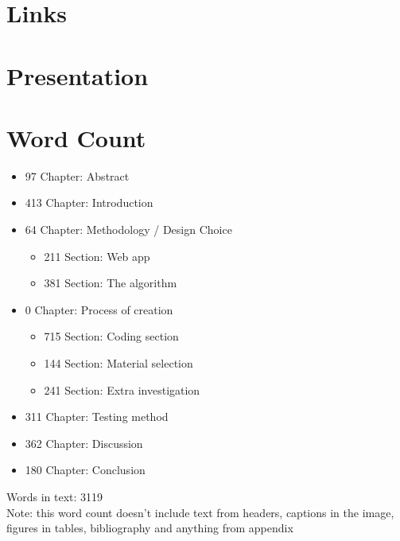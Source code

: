 \documentclass[twoside, a4paper]{report}
\begin{document}
\chapter{Links}

\chapter{Presentation}

\chapter{Word Count}
\begin{itemize}
    \item 97 Chapter: Abstract
    \item 413 Chapter: Introduction
    \item 64 Chapter: Methodology / Design Choice
    \begin{itemize}
        \item 211 Section: Web app
        \item 381 Section: The algorithm
    \end{itemize}
    \item 0 Chapter: Process of creation
    \begin{itemize}
        \item 715 Section: Coding section
        \item 144 Section: Material selection
        \item 241 Section: Extra investigation
    \end{itemize}
    \item 311 Chapter: Testing method
    \item 362 Chapter: Discussion
    \item 180 Chapter: Conclusion
\end{itemize}
Words in text: 3119\\
Note: this word count doesn't include text from headers, captions in the image, figures in tables, bibliography and anything from appendix
\end{document}
